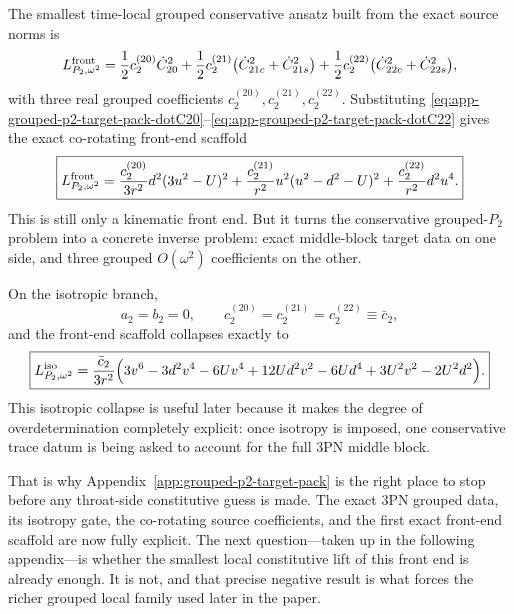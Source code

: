 \documentclass[11pt]{article}
\begin{document}
The smallest time-local grouped conservative ansatz built from the exact source
norms is
\begin{equation}
L_{P_2,\omega^2}^{\rm front}
=\frac12c_2^{(20)}\dot C_{20}^2
+\frac12c_2^{(21)}\bigl(\dot C_{21c}^2+\dot C_{21s}^2\bigr)
+\frac12c_2^{(22)}\bigl(\dot C_{22c}^2+\dot C_{22s}^2\bigr),
\label{eq:app-grouped-p2-target-pack-front-raw}
\end{equation}
with three real grouped coefficients
\(c_2^{(20)},c_2^{(21)},c_2^{(22)}\).
Substituting
\eqref{eq:app-grouped-p2-target-pack-dotC20}--\eqref{eq:app-grouped-p2-target-pack-dotC22}
gives the exact co-rotating front-end scaffold
\begin{equation}
\boxed{
L_{P_2,\omega^2}^{\rm front}
=
\frac{c_2^{(20)}}{3r^2}d^2(3u^2-U)^2
+
\frac{c_2^{(21)}}{r^2}u^2(u^2-d^2-U)^2
+
\frac{c_2^{(22)}}{r^2}d^2u^4.
}
\label{eq:app-grouped-p2-target-pack-front-substituted}
\end{equation}
This is still only a kinematic front end.  But it turns the conservative
grouped-$P_2$ problem into a concrete inverse problem: exact middle-block target
data on one side, and three grouped \(O(\omega^2)\) coefficients on the other.

On the isotropic branch,
\begin{equation}
 a_2=b_2=0,
 \qquad
 c_2^{(20)}=c_2^{(21)}=c_2^{(22)}\equiv \bar c_2,
\label{eq:app-grouped-p2-target-pack-isotropic-c2}
\end{equation}
and the front-end scaffold collapses exactly to
\begin{equation}
\boxed{
L_{P_2,\omega^2}^{\rm iso}
=
\frac{\bar c_2}{3r^2}
\Bigl(
3v^6-3d^2v^4-6Uv^4+12Ud^2v^2-6Ud^4+3U^2v^2-2U^2d^2
\Bigr).
}
\label{eq:app-grouped-p2-target-pack-isotropic-front}
\end{equation}
This isotropic collapse is useful later because it makes the degree of
overdetermination completely explicit: once isotropy is imposed, one conservative
trace datum is being asked to account for the full $3$PN middle block.

That is why Appendix~\ref{app:grouped-p2-target-pack} is the right place to stop
before any throat-side constitutive guess is made.  The exact $3$PN grouped data,
its isotropy gate, the co-rotating source coefficients, and the first exact
front-end scaffold are now fully explicit.  The next question---taken up in the
following appendix---is whether the smallest local constitutive lift of this
front end is already enough.  It is not, and that precise negative result is what
forces the richer grouped local family used later in the paper.
\end{document}
